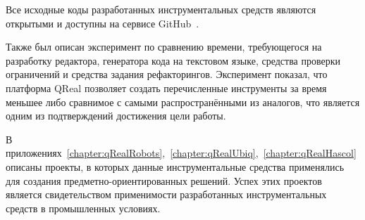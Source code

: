 Все исходные коды разработанных инструментальных средств являются открытыми и доступны
на сервисе GitHub~\cite{qrealGithub}.

Также был описан эксперимент по сравнению времени, требующегося на разработку редактора,
генератора кода на текстовом языке, средства проверки ограничений и средства задания рефакторингов.
Эксперимент показал, что платформа QReal позволяет создать перечисленные инструменты за время
меньшее либо сравнимое с самыми распространёнными из аналогов, что является одним из подтверждений достижения
цели работы.

В приложениях~\ref{chapter:qRealRobots},~\ref{chapter:qRealUbiq},~\ref{chapter:qRealHascol} описаны
проекты, в которых данные инструментальные средства применялись для создания предметно-ориентированных решений.
Успех этих проектов является свидетельством применимости разработанных инструментальных средств
в промышленных условиях.

